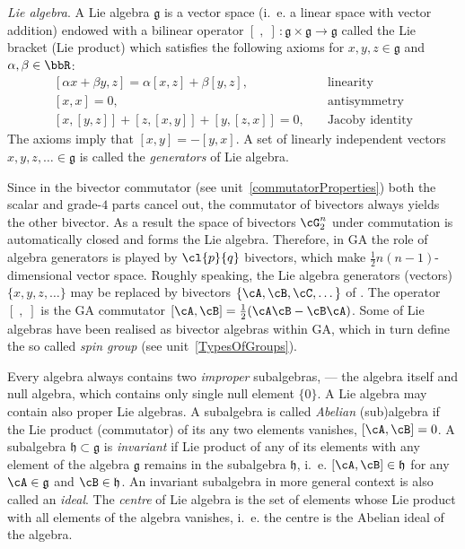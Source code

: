 \begin{unit}\textit{Lie algebra}. \label{Liealgebra}
A Lie algebra $\mathfrak{g}$ is a vector space (i.~e. a linear
space with vector addition) endowed with a bilinear operator
$[\;,\;]\,:\mathfrak{g}\times\mathfrak{g}\rightarrow\mathfrak{g}$
called the Lie bracket (Lie product) which satisfies the following
axioms for $x,y,z\in\mathfrak{g}$ and $\alpha,\beta\in\bbR$:
\[\begin{split}
[\alpha x+\beta y,z]=\alpha[x,z]+\beta[y,z],&\quad\textrm{linearity}\\
[x,x]=0,& \quad\textrm{antisymmetry}\\
[x,[y,z]]+[z,[x,y]]+[y,[z,x]]=0,&\quad\textrm{Jacoby identity}
\end{split}\]
The axioms imply that $[x,y]=-[y,x]$. A set of linearly
independent vectors $x,y,z,\ldots \in\mathfrak{g}$ is called the
\textit{generators} of Lie algebra.

Since in the bivector commutator (see unit~\ref{commutatorProperties}) both the scalar and grade-$4$ parts cancel out, the commutator of bivectors always yields the other bivector. As a result the
space of bivectors $\cG_2^n$ under commutation is automatically
closed and forms the Lie algebra. Therefore, in GA the role of
algebra generators is played by $\cl{p}{q}$ bivectors, which make
$\tfrac{1}{2}n(n-1)$-dimensional vector space. Roughly speaking,
the Lie algebra generators (vectors) $\{x,y,z,\dots\}$ may be
replaced by bivectors $\{\cA,\cB,\cC,\dots\}$ of . The
operator $[\;,\;]$ is the GA commutator
$[\cA,\cB]=\tfrac{1}{2}(\cA\cB-\cB\cA)$. Some of Lie algebras have
been realised as bivector algebras within GA, which in turn define
the so called \textit{spin group} (see unit~\ref{TypesOfGroups}).

Every algebra  always contains two {\it improper} subalgebras, ---
the algebra itself and null algebra, which contains only single
null element $\{0\}$. A Lie algebra may contain also proper Lie
algebras. A subalgebra is called \textit{Abelian} (sub)algebra if
the Lie product (commutator) of its any two elements vanishes,
$[\cA,\cB]=0$.  A subalgebra $\mathfrak{h}\subset \mathfrak{g}$ is
{\it invariant} if Lie product of any of its elements with any
element of the algebra $\mathfrak{g}$ remains in the subalgebra
$\mathfrak{h}$, i.~e. $[\cA,\cB]\in \mathfrak{h}$ for any $\cA\in
\mathfrak{g}$ and $\cB\in \mathfrak{h}$. An invariant subalgebra
in more general context is also called an {\it ideal}. The {\it
centre} of Lie algebra  is the set of elements whose Lie product
with all elements of the algebra vanishes, i.~e. the centre is the
Abelian ideal of the algebra.


\end{unit}
